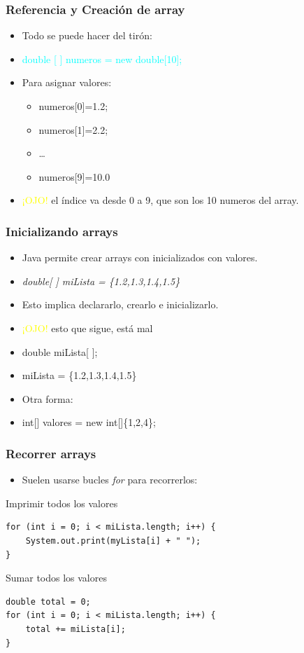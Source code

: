 \documentclass{beamer}
\begin{document}
\begin{frame}[fragile]
    \frametitle{Referencia y Creación de array}
    \begin{itemize}[<+->]
    \item Todo se puede hacer del tirón:
    \item \textcolor{cyan}{double [ ] numeros =  new double[10];}
    \item Para asignar valores:
    \begin{itemize}
	\item numeros[0]=1.2;
	\item numeros[1]=2.2;
	\item \dots
	\item numeros[9]=10.0 
	\end{itemize}
	\item \textcolor{yellow}{¡OJO!} el índice va desde 0 a 9, que son los 10 numeros del array.
    \end{itemize}
 
\end{frame}



\begin{frame}[fragile]
    \frametitle{Inicializando arrays}
	\begin{itemize}[<+->]
	\item Java permite crear arrays con inicializados con valores.
	\item \emph{double[ ] miLista = \{1.2,1.3,1.4,1.5\}}
	\item Esto implica declararlo, crearlo e inicializarlo.
	\item \textcolor{yellow}{¡OJO!} esto que sigue, está mal
	\item double miLista[ ];
	\item miLista = \{1.2,1.3,1.4,1.5\}
	\item Otra forma:
	\item int[] valores = new int[]\{1,2,4\};
\end{itemize}	  
\end{frame}

\begin{frame}[fragile]
    \frametitle{Recorrer arrays}
    \begin{itemize}[<+-| alert@+>]
	\item Suelen usarse bucles \emph{for} para recorrerlos:
	\end{itemize}
	\pause
	\begin{block}{Imprimir todos los valores}
	\begin{verbatim}
for (int i = 0; i < miLista.length; i++) {
    System.out.print(myLista[i] + " ");
}
\end{verbatim}
\end{block}
\pause
\begin{block}{Sumar todos los valores}
\begin{verbatim}
double total = 0;
for (int i = 0; i < miLista.length; i++) {
    total += miLista[i];
}
\end{verbatim}
\end{block}
\end{frame}
\end{document}
